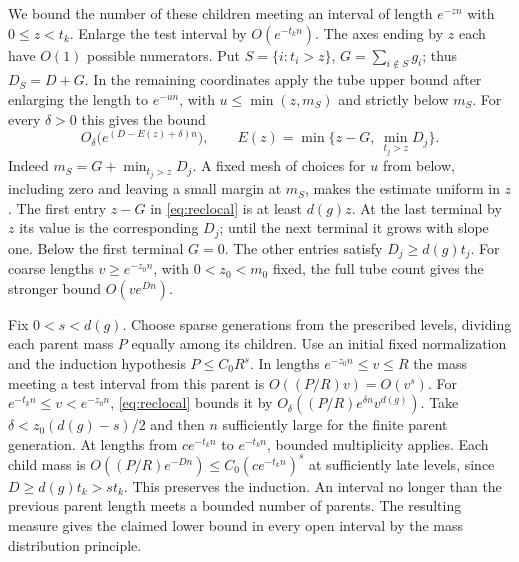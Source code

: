 \documentclass[11pt,a4paper,reqno]{amsart}
\theoremstyle{definition}
\theoremstyle{remark}
\numberwithin{equation}{section}
\begin{document}
We bound the number of these children meeting an interval of length \(e^{-zn}\) with \(0\le z<t_k\). Enlarge the test interval by \(O(e^{-t_kn})\). The axes ending by \(z\) each have \(O(1)\) possible numerators. Put \(S=\{i:t_i>z\}\), \(G=\sum_{i\notin S}g_i\); thus \(D_S=D+G\). In the remaining coordinates apply the tube upper bound after enlarging the length to \(e^{-un}\), with \(u\le\min(z,m_S)\) and strictly below \(m_S\). For every \(\delta>0\) this gives the bound
\begin{equation}\label{eq:reclocal}
 O_\delta\big(e^{(D-E(z)+\delta)n}\big),\qquad
 E(z)=\min\big\{z-G,\ \min_{t_j>z}D_j\big\}.
\end{equation}
Indeed \(m_S=G+\min_{t_j>z}D_j\). A fixed mesh of choices for \(u\) from below, including zero and leaving a small margin at \(m_S\), makes the estimate uniform in \(z\). The first entry \(z-G\) in \eqref{eq:reclocal} is at least \(d(g)z\). At the last terminal by \(z\) its value is the corresponding \(D_j\); until the next terminal it grows with slope one. Below the first terminal \(G=0\). The other entries satisfy \(D_j\ge d(g)t_j\). For coarse lengths \(v\ge e^{-z_0n}\), with \(0<z_0<m_0\) fixed, the full tube count gives the stronger bound \(O(v e^{Dn})\).

Fix \(0<s<d(g)\). Choose sparse generations from the prescribed levels, dividing each parent mass \(P\) equally among its children. Use an initial fixed normalization and the induction hypothesis \(P\le C_0R^s\). In lengths \(e^{-z_0n}\le v\le R\) the mass meeting a test interval from this parent is \(O((P/R)v)=O(v^s)\). For \(e^{-t_kn}\le v< e^{-z_0n}\), \eqref{eq:reclocal} bounds it by \(O_\delta((P/R)e^{\delta n}v^{d(g)})\). Take \(\delta<z_0(d(g)-s)/2\) and then \(n\) sufficiently large for the finite parent generation. At lengths from \(c e^{-t_kn}\) to \(e^{-t_kn}\), bounded multiplicity applies. Each child mass is \(O((P/R)e^{-Dn})\le C_0(c e^{-t_kn})^s\) at sufficiently late levels, since \(D\ge d(g)t_k>s t_k\). This preserves the induction. An interval no longer than the previous parent length meets a bounded number of parents. The resulting measure gives the claimed lower bound in every open interval by the mass distribution principle.
\end{document}
